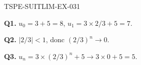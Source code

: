 \begin{corrige}{TSPE-SUITLIM-EX-031}

\textbf{Q1.} $u_0 = 3+5 = 8$, $u_1 = 3 \times 2/3 + 5 = 7$.

\textbf{Q2.} $|2/3| < 1$, donc $(2/3)^n \to 0$.

\textbf{Q3.} $u_n = 3 \times (2/3)^n + 5 \to 3 \times 0 + 5 = \boxed{5}$.

\end{corrige}
